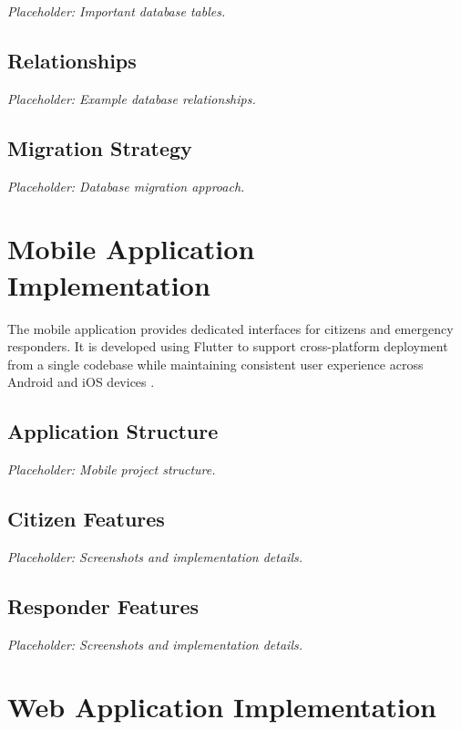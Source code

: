 \textit{Placeholder: Important database tables.}

\subsection{Relationships}

\textit{Placeholder: Example database relationships.}

\subsection{Migration Strategy}

\textit{Placeholder: Database migration approach.}


\section{Mobile Application Implementation}

The mobile application provides dedicated interfaces for citizens and emergency responders. It is developed using Flutter to support cross-platform deployment from a single codebase while maintaining consistent user experience across Android and iOS devices \cite{flutter}.

\subsection{Application Structure}

\textit{Placeholder: Mobile project structure.}

\subsection{Citizen Features}

\textit{Placeholder: Screenshots and implementation details.}

\subsection{Responder Features}

\textit{Placeholder: Screenshots and implementation details.}


\section{Web Application Implementation}

